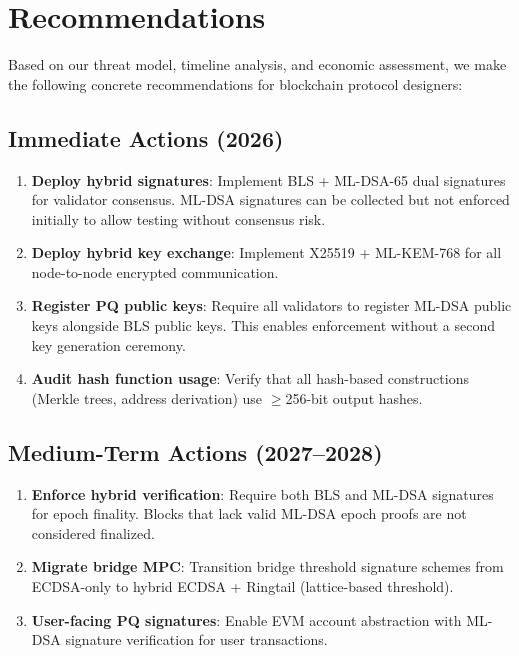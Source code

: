 \documentclass[11pt,a4paper]{article}
\begin{document}
\section{Recommendations}
\label{sec:recommendations}

Based on our threat model, timeline analysis, and economic assessment, we make the
following concrete recommendations for blockchain protocol designers:

\subsection{Immediate Actions (2026)}

\begin{enumerate}[leftmargin=2em]
  \item \textbf{Deploy hybrid signatures}: Implement BLS + ML-DSA-65 dual signatures
        for validator consensus. ML-DSA signatures can be collected but not enforced
        initially to allow testing without consensus risk.
  \item \textbf{Deploy hybrid key exchange}: Implement X25519 + ML-KEM-768 for all
        node-to-node encrypted communication.
  \item \textbf{Register PQ public keys}: Require all validators to register ML-DSA
        public keys alongside BLS public keys. This enables enforcement without
        a second key generation ceremony.
  \item \textbf{Audit hash function usage}: Verify that all hash-based constructions
        (Merkle trees, address derivation) use $\geq$256-bit output hashes.
\end{enumerate}

\subsection{Medium-Term Actions (2027--2028)}

\begin{enumerate}[leftmargin=2em]
  \item \textbf{Enforce hybrid verification}: Require both BLS and ML-DSA signatures
        for epoch finality. Blocks that lack valid ML-DSA epoch proofs are not
        considered finalized.
  \item \textbf{Migrate bridge MPC}: Transition bridge threshold signature schemes
        from ECDSA-only to hybrid ECDSA + Ringtail (lattice-based threshold).
  \item \textbf{User-facing PQ signatures}: Enable EVM account abstraction with
        ML-DSA signature verification for user transactions.
\end{enumerate}
\end{document}
